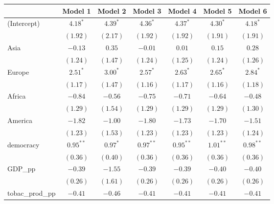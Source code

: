 
\begin{table}[!h]
\begin{center}
\begin{tabular}{l c c c c c c }
\toprule
 & Model 1 & Model 2 & Model 3 & Model 4 & Model 5 & Model 6 \\
\midrule
(Intercept)             & $4.18^{*}$   & $4.39^{*}$   & $4.36^{*}$   & $4.37^{*}$   & $4.30^{*}$   & $4.18^{*}$   \\
                        & $(1.92)$     & $(2.17)$     & $(1.92)$     & $(1.92)$     & $(1.91)$     & $(1.91)$     \\
Asia                    & $-0.13$      & $0.35$       & $-0.01$      & $0.01$       & $0.15$       & $0.28$       \\
                        & $(1.24)$     & $(1.47)$     & $(1.24)$     & $(1.25)$     & $(1.24)$     & $(1.26)$     \\
Europe                  & $2.51^{*}$   & $3.00^{*}$   & $2.57^{*}$   & $2.63^{*}$   & $2.65^{*}$   & $2.84^{*}$   \\
                        & $(1.17)$     & $(1.47)$     & $(1.16)$     & $(1.17)$     & $(1.16)$     & $(1.18)$     \\
Africa                  & $-0.84$      & $-0.56$      & $-0.75$      & $-0.71$      & $-0.64$      & $-0.48$      \\
                        & $(1.29)$     & $(1.54)$     & $(1.29)$     & $(1.29)$     & $(1.29)$     & $(1.30)$     \\
America                 & $-1.82$      & $-1.00$      & $-1.80$      & $-1.73$      & $-1.70$      & $-1.51$      \\
                        & $(1.23)$     & $(1.53)$     & $(1.23)$     & $(1.23)$     & $(1.23)$     & $(1.24)$     \\
democracy               & $0.95^{**}$  & $0.97^{*}$   & $0.97^{**}$  & $0.95^{**}$  & $1.01^{**}$  & $0.98^{**}$  \\
                        & $(0.36)$     & $(0.40)$     & $(0.36)$     & $(0.36)$     & $(0.36)$     & $(0.36)$     \\
GDP\_pp                 & $-0.39$      & $-1.55$      & $-0.39$      & $-0.39$      & $-0.40$      & $-0.40$      \\
                        & $(0.26)$     & $(1.61)$     & $(0.26)$     & $(0.26)$     & $(0.26)$     & $(0.26)$     \\
tobac\_prod\_pp         & $-0.41$      & $-0.46$      & $-0.41$      & $-0.41$      & $-0.41$      & $-0.41$      \\

\end{tabular}
\end{center}
\end{table}
